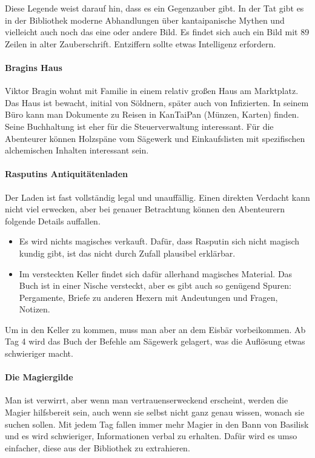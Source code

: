 \documentclass[a4paper,10pt]{scrartcl}
\def\drugname{Basilisk}
\begin{document}
Diese Legende weist darauf hin, dass es ein Gegenzauber gibt. In der Tat
gibt es in der Bibliothek moderne Abhandlungen über kantaipanische
Mythen und vielleicht auch noch das eine oder andere Bild. Es findet
sich auch ein Bild mit 89 Zeilen in alter Zauberschrift. Entziffern
sollte etwas Intelligenz erfordern.

\paragraph{Bragins Haus}

Viktor Bragin wohnt mit Familie in einem relativ großen Haus am
Marktplatz. Das Haus ist bewacht, initial von Söldnern, später auch von
Infizierten. In seinem Büro kann man Dokumente zu Reisen in KanTaiPan
(Münzen, Karten) finden. Seine Buchhaltung ist eher für die
Steuerverwaltung interessant. Für die Abenteurer können Holzspäne vom
Sägewerk und Einkaufslisten mit spezifischen alchemischen Inhalten
interessant sein.

\paragraph{Rasputins Antiquitätenladen}

Der Laden ist fast vollständig legal und unauffällig. Einen direkten
Verdacht kann nicht viel erwecken, aber bei genauer Betrachtung können
den Abenteurern folgende Details auffallen.

\begin{itemize}
  \item Es wird nichts magisches verkauft. Dafür, dass Rasputin sich
    nicht magisch kundig gibt, ist das nicht durch Zufall plausibel
    erklärbar.
  \item Im versteckten Keller findet sich dafür allerhand magisches
    Material.  Das Buch ist in einer Nische versteckt, aber es gibt auch
    so genügend Spuren: Pergamente, Briefe zu anderen Hexern mit
    Andeutungen und Fragen, Notizen.
\end{itemize}

Um in den Keller zu kommen, muss man aber an dem Eisbär vorbeikommen. Ab
Tag 4 wird das Buch der Befehle am Sägewerk gelagert, was die Auflösung
etwas schwieriger macht.

\paragraph{Die Magiergilde}

Man ist verwirrt, aber wenn man vertrauenserweckend erscheint, werden die 
Magier hilfsbereit sein, auch wenn sie selbst nicht ganz genau wissen, wonach 
sie suchen sollen. Mit jedem Tag fallen immer mehr Magier in den Bann
von \drugname{} und es wird schwieriger, Informationen verbal zu erhalten.
Dafür wird es umso einfacher, diese aus der Bibliothek zu extrahieren.
\end{document}
